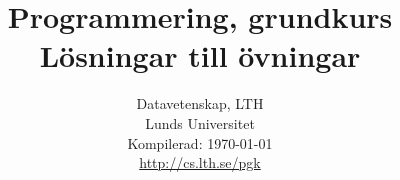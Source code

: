 \documentclass[a4paper]{compendium}
\title{
{\bf\Huge\sffamily  Programmering, grundkurs} 
\\ \vspace{2em}
{\sffamily  Lösningar till övningar }
}
\date{%
Datavetenskap, LTH \\ 
Lunds Universitet  \\
\vspace{1em}Kompilerad: \today\\
\vspace{2em}\url{http://cs.lth.se/pgk}
}
\newif\ifPreSolution  %
\begin{document}
\maketitle
\mainmatter
\tableofcontents

\PreSolutionfalse 
\PreSolutionfalse 













\end{document}
